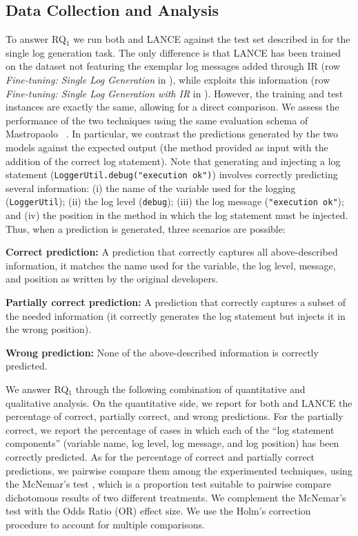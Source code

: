 \subsection{Data Collection and Analysis}

To answer RQ$_1$ we run both \approach and LANCE against the test set described in  for the single log generation task. The only difference is that LANCE has been trained on the dataset not featuring the exemplar log messages added through IR (row \emph{Fine-tuning: Single Log Generation} in ), while \approach exploits this information (row \emph{Fine-tuning: Single Log Generation with IR} in ). However, the training and test instances are exactly the same, allowing for a direct comparison. We assess the performance of the two techniques using the same evaluation schema of Mastropaolo \etal~\cite{mastropaolo2022using}. In particular, we contrast the predictions generated by the two models against the expected output (\ie the \java method provided as input with the addition of the correct log statement). Note that generating and injecting a log statement  (\eg \texttt{LoggerUtil.debug("execution ok")}) involves correctly predicting several information: (i) the name of the variable used for the logging (\ie \texttt{LoggerUtil}); (ii) the log level (\ie \texttt{debug}); (iii) the log message (\ie \texttt{"execution ok"}); and (iv) the position in the method in which the log statement must be injected. Thus, when a prediction is generated, three scenarios are possible:

\textbf{Correct prediction:} A prediction that correctly captures all above-described information, \ie it matches the name used for the variable, the log level, message, and position as written by the original developers.

\textbf{Partially correct prediction:} A prediction that correctly captures a subset of the needed information (\eg it correctly generates the log statement but injects it in the wrong position).

\textbf{Wrong prediction:} None of the above-described information is correctly predicted.

We answer RQ$_1$ through the following combination of quantitative and qualitative analysis. On the quantitative side, we report for both \approach and LANCE the percentage of correct, partially correct, and wrong predictions. For the partially correct, we report the percentage of cases in which each of the ``log statement components'' (\ie variable name, log level, log message, and log position) has been correctly predicted. As for the percentage of correct and partially correct predictions, we pairwise compare them among the experimented techniques, using the McNemar's test \cite{mcnemar}, which is a proportion test suitable to pairwise compare dichotomous results of two different treatments. We complement the McNemar's test with the Odds Ratio (OR) effect size. We use the Holm's correction procedure \cite{Holm1979a} to account for multiple comparisons.

